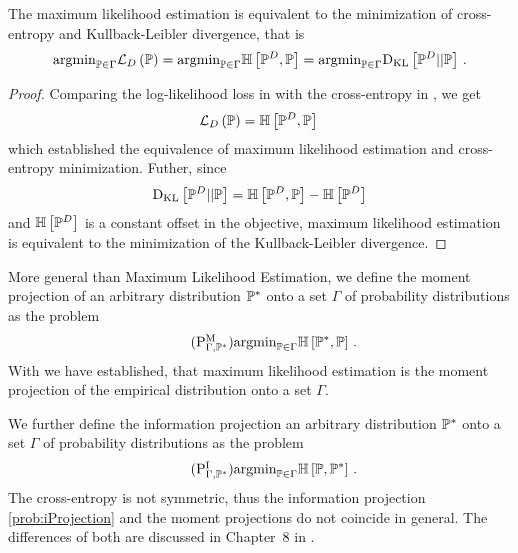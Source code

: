 \begin{lemma}
    \label{lem:centropyMLE}
    The maximum likelihood estimation  is equivalent to the minimization of cross-entropy and Kullback-Leibler divergence, that is
    \begin{align*}
        \mathrm{argmin}_{\mathbb{P}\in\Gamma} \mathcal{L}_{D}\left(\mathbb{P}\right)
        = \mathrm{argmin}_{\mathbb{P}\in\Gamma} \mathbb{H}\left[\mathbb{P}^{D},\mathbb{P}\right]
        = \mathrm{argmin}_{\mathbb{P}\in\Gamma} \mathrm{D}_{\mathrm{KL}}\left[ \mathbb{P}^{D} || \mathbb{P} \right] \, .
    \end{align*}
\end{lemma}
\begin{proof}
    Comparing the log-likelihood loss in  with the cross-entropy in , we get
    \begin{align*}
        \mathcal{L}_{D}\left(\mathbb{P}\right) = \mathbb{H}\left[\mathbb{P}^{D},\mathbb{P}\right] \,
    \end{align*}
    which established the equivalence of maximum likelihood estimation and cross-entropy minimization.
    Futher, since
    \begin{align*}
        \mathrm{D}_{\mathrm{KL}}\left[ \mathbb{P}^{D} || \mathbb{P} \right] = \mathbb{H}\left[\mathbb{P}^{D},\mathbb{P}\right] - \mathbb{H}\left[\mathbb{P}^{D}\right]
    \end{align*}
    and $\mathbb{H}\left[\mathbb{P}^{D}\right]$ is a constant offset in the objective, maximum likelihood estimation is equivalent to the minimization of the Kullback-Leibler divergence.
\end{proof}

More general than Maximum Likelihood Estimation, we define the moment projection of an arbitrary distribution $\mathbb{P}^*$ onto a set $\Gamma$ of probability distributions as the problem
\begin{align}
    \label{prob:mProjection}\tag{$\probtagtypeinst{\mathrm{M}}{\Gamma,\gendistribution}$}
    \argmin_{\probtensorin} \centropyof{\gendistribution}{\probtensor} \, .
\end{align}
With  we have established, that maximum likelihood estimation is the moment projection of the empirical distribution onto a set $\Gamma$.

We further define the information projection an arbitrary distribution $\mathbb{P}^*$ onto a set $\Gamma$ of probability distributions as the problem
\begin{align}
    \label{prob:iProjection}\tag{$\probtagtypeinst{\mathrm{I}}{\Gamma,\gendistribution}$}
    \argmin_{\probtensorin} \centropyof{\probtensor}{\gendistribution} \, .
\end{align}
The cross-entropy is not symmetric, thus the information projection \eqref{prob:iProjection} and the moment projections do not coincide in general.
The differences of both are discussed in Chapter~8 in \cite{koller_probabilistic_2009}.

